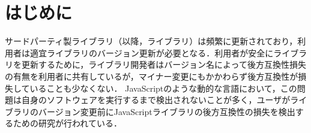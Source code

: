 \documentclass[T,J]{fose} %
\begin{document}

\section{はじめに}
サードパーティ製ライブラリ（以降，ライブラリ）は頻繁に更新されており，利用者は適宜ライブラリのバージョン更新が必要となる．利用者が安全にライブラリを更新するために，ライブラリ開発者はバージョン名によって後方互換性損失の有無を利用者に共有しているが，マイナー変更にもかかわらず後方互換性が損失していることも少なくない．
JavaScriptのような動的な言語において，この問題は自身のソフトウェアを実行するまで検出されないことが多く，ユーザがライブラリのバージョン変更前にJavaScriptライブラリの後方互換性の損失を検出するための研究が行われている．
\end{document}
